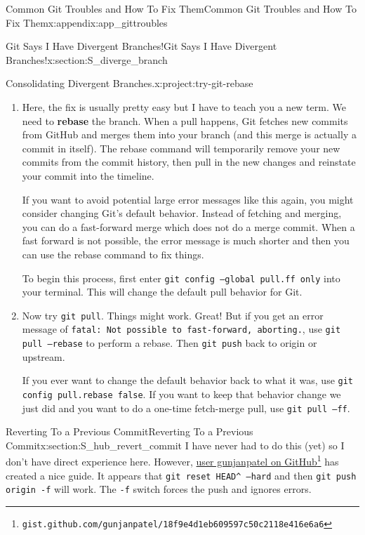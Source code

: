 \documentclass[oneside,10pt,]{book}
\newcommand{\mono}[1]{\texttt{#1}}
\newcommand{\terminology}[1]{\textbf{#1}}
\begin{document}
\begin{appendixptx}{Common Git Troubles and How To Fix Them}{}{Common Git Troubles and How To Fix Them}{}{}{x:appendix:app_gittroubles}
\begin{sectionptx}{Git Says I Have Divergent Branches!}{}{Git Says I Have Divergent Branches!}{}{}{x:section:S_diverge_branch}
\begin{project}{Consolidating Divergent Branches.}{x:project:try-git-rebase}
\begin{enumerate}[font=\bfseries,label=(\alph*),ref=\alph*]
\begin{console}{0}{1}{0}
hint: invocation.
fatal: Need to specify how to reconcile divergent branches.
\end{console}
 which is quite overwhelming.%
\item{}Here, the fix is usually pretty easy but I have to teach you a new term. We need to \terminology{rebase} the branch. When a pull happens, Git fetches new commits from GitHub and merges them into your branch (and this merge is actually a commit in itself). The rebase command will temporarily remove your new commits from the commit history, then pull in the new changes and reinstate your commit into the timeline.%
\par
If you want to avoid potential large error messages like this again, you might consider changing Git's default behavior. Instead of fetching and merging, you can do a fast-forward merge which does not do a merge commit. When a fast forward is not possible, the error message is much shorter and then you can use the rebase command to fix things.%
\par
To begin this process, first enter \mono{git config --global pull.ff only} into your terminal. This will change the default pull behavior for Git.%
\item{}Now try \mono{git pull}. Things might work. Great! But if you get an error message of \mono{fatal: Not possible to fast-forward, aborting.}, use \mono{git pull --rebase} to perform a rebase. Then \mono{git push} back to origin or upstream.%
\par
If you ever want to change the default behavior back to what it was, use \mono{git config pull.rebase false}. If you want to keep that behavior change we just did and you want to do a one-time fetch-merge pull, use \mono{git pull --ff}.%
\end{enumerate}
\end{project}%
\end{sectionptx}
%
%
\typeout{************************************************}
\typeout{************************************************}
%
\begin{sectionptx}{Reverting To a Previous Commit}{}{Reverting To a Previous Commit}{}{}{x:section:S_hub_revert_commit}
%
%
%
%
%
I have never had to do this (yet) so I don't have direct experience here. However, \href{https://gist.github.com/gunjanpatel/18f9e4d1eb609597c50c2118e416e6a6}{user gunjanpatel on GitHub}\footnote{\nolinkurl{gist.github.com/gunjanpatel/18f9e4d1eb609597c50c2118e416e6a6}\label{g:fn:idm479027960}} has created a nice guide. It appears that \mono{git reset HEAD\textasciicircum{} --hard} and then \mono{git push origin -f} will work. The \mono{-f} switch forces the push and ignores errors.%

\end{sectionptx}
\end{appendixptx}
\end{document}
